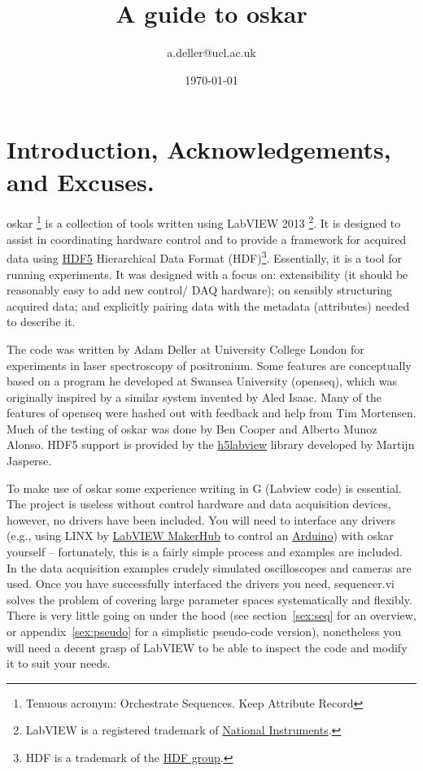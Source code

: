 \documentclass[10pt,a4paper]{article}
\title{A guide to oskar}
\author{a.deller@ucl.ac.uk}
\date{\today}
\begin{document}
\maketitle
\tableofcontents

\section{Introduction, Acknowledgements, and Excuses.}
oskar \footnote{Tenuous acronym: Orchestrate Sequences. Keep Attribute Record} is a collection of tools written using LabVIEW 2013 \footnote{LabVIEW is a registered trademark of \href{http://www.ni.com/}{National Instruments}.}. It is designed to assist in coordinating hardware control and to provide a framework for acquired data using \href{https://www.hdfgroup.org/why_hdf/}{HDF5} Hierarchical Data Format (HDF)\footnote{HDF is a trademark of the \href{http://www.hdfgroup.org/}{HDF group}.}.  Essentially, it is a tool for running experiments. It was designed with a focus on: extensibility (it should be reasonably easy to add new control/ DAQ hardware); on sensibly structuring acquired data; and explicitly pairing data with the metadata (attributes) needed to describe it.

The code was written by Adam Deller at University College London for experiments in laser spectroscopy of positronium. Some features are conceptually based on a program he developed at Swansea University (openseq), which was originally inspired by a similar system invented by Aled Isaac.  Many of the features of openseq were hashed out with feedback and help from Tim Mortensen. Much of the testing of oskar was done by Ben Cooper and Alberto Munoz Alonso.    HDF5 support is provided by the \href{http://h5labview.sourceforge.net/}{h5labview} library developed by Martijn Jasperse.

To make use of oskar some experience writing in G (Labview code) is essential. The project is useless without control hardware and data acquisition devices, however, no drivers have been included. You will need to interface any drivers (e.g., using  LINX by \href{https://www.labviewmakerhub.com}{LabVIEW MakerHub} to control an  \href{https://www.arduino.cc/}{Arduino}) with oskar yourself -- fortunately, this is a fairly simple process and examples are included.  In the data acquisition examples crudely simulated oscilloscopes and cameras are used.  Once you have successfully  interfaced the drivers you need, sequencer.vi solves the problem of covering large parameter spaces systematically and flexibly.  There is very little going on under the hood (see section~\ref{sex:seq} for an overview, or appendix~\ref{sex:pseudo} for a simplistic pseudo-code version),  nonetheless you will need a decent grasp of LabVIEW to be able to inspect the code and modify it to suit your needs.
\end{document}
